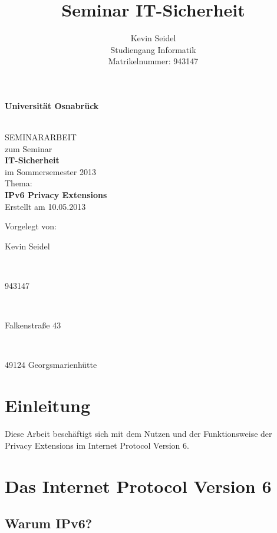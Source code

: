 \documentclass[a4paper, 12pt]{scrartcl}
\title{Seminar IT-Sicherheit}
\author{Kevin Seidel \\ Studiengang Informatik \\ Matrikelnummer: 943147}
\begin{document}
\begin{titlepage}
\begin{center}
\vspace*{1.5cm}
\begin{Large}
\textbf{Universität Osnabrück}
\end{Large}

\noindent\hrulefill
\\[3.5cm]
SEMINARARBEIT \\[1cm]
zum Seminar \\[1cm]
\textbf{IT-Sicherheit} \\[1.5cm]
im Sommersemester 2013 \\[1.5cm]
Thema: \\[0.5cm]
\textbf{IPv6 Privacy Extensions} \\[2cm]
Erstellt am 10.05.2013
\end{center}
\vfill
\begin{flushleft}
Vorgelegt von: 
\hfill \parbox{46mm}{Kevin Seidel} \\
\hfill \parbox{46mm}{943147} \\
\hfill \parbox{46mm}{Falkenstraße 43} \\
\hfill \parbox{46mm}{49124 Georgsmarienhütte}
\end{flushleft}
\end{titlepage}

\newpage

\setcounter{page}{2}
\tableofcontents

\newpage
{}
\setcounter{page}{1}

\section{Einleitung}
Diese Arbeit beschäftigt sich mit dem Nutzen und der Funktionsweise der Privacy Extensions im Internet Protocol Version 6.

\newpage

\section{Das Internet Protocol Version 6}
\subsection{Warum IPv6?}
\end{document}
